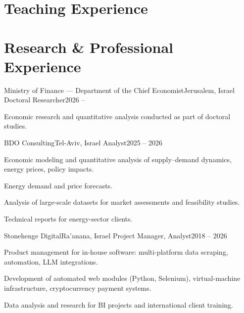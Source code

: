 \documentclass[a4paper, 10pt]{article}
\begin{document}
\section{Teaching Experience}

\section{Research \& Professional Experience}
\cventry
{Ministry of Finance --- Department of the Chief Economist}{Jerusalem, Israel}
{Doctoral Researcher}{2026 -- }
\cvItems
\item Economic research and quantitative analysis conducted as part of doctoral studies.
\cvItemsEnd

\cventry
{BDO Consulting}{Tel-Aviv, Israel}
{Analyst}{2025 -- 2026}
\cvItems
\item Economic modeling and quantitative analysis of supply--demand dynamics, energy prices, policy impacts.
\item Energy demand and price forecasts.
\item Analysis of large-scale datasets for market assessments and feasibility studies.
\item Technical reports for energy-sector clients.
\cvItemsEnd

\cventry
{Stonehenge Digital}{Ra'anana, Israel}
{Project Manager, Analyst}{2018 -- 2026}
\cvItems
\item Product management for in-house software: multi-platform data scraping, automation, LLM integrations.
\item Development of automated web modules (Python, Selenium), virtual-machine infrastructure, cryptocurrency payment systems.
\item Data analysis and research for BI projects and international client training.
\cvItemsEnd

\end{document}
